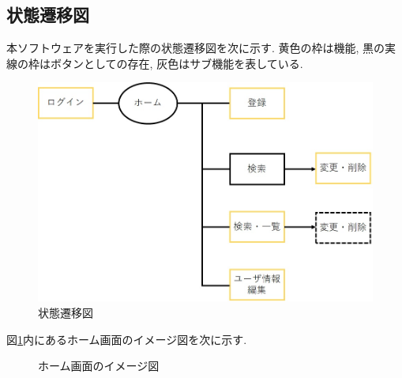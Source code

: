 \documentclass[11ptm]{jsarticle}
\begin{document}
\clearpage
\subsection{状態遷移図}
\label{subsec:状態遷移図}
本ソフトウェアを実行した際の状態遷移図を次に示す. 黄色の枠は機能, 黒の実線の枠はボタンとしての存在, 灰色はサブ機能を表している. 
\begin{figure}[h]
  \centering
  \includegraphics[keepaspectratio, height=0.4\linewidth]{transition-diagram.jpg}
  \caption{\label{fig:状態遷移図}状態遷移図}
\end{figure}\par
図\ref{fig:状態遷移図}内にあるホーム画面のイメージ図を次に示す.
\begin{figure}[h]
  \centering
  \caption{\label{fig:ホーム画面のイメージ図}ホーム画面のイメージ図}
\end{figure}




\end{document}
